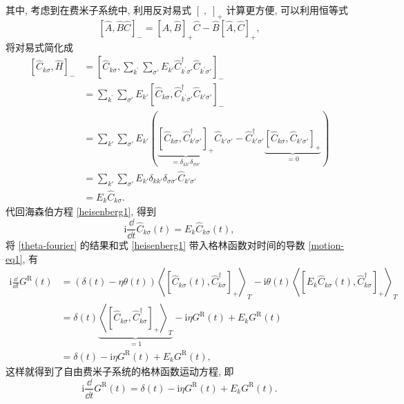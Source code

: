 其中, 考虑到在费米子系统中, 利用反对易式 $[\; ,\;]_+$ 计算更方便, 可以利用恒等式
\begin{equation}
    \left[ \hat{A},\hat{B}\hat{C} \right]_-=\left[ \hat{A},\hat{B} \right]_+\hat{C}-\hat{B}\left[ \hat{A},\hat{C} \right]_+,
\end{equation}
将对易式简化成
   \begin{align}
        \left[ \hat{C}_{k\sigma}^{ },\hat{H} \right]_- &=\left[ \hat{C}_{k\sigma},\sum_{k^\prime}\sum_{\sigma'}E_{k'}\hat{C}_{k^\prime\sigma'}^{\dagger} \hat{C}_{k^\prime\sigma'}^{ } \right]_-\nonumber\\
        &=\sum_{k^\prime}\sum_{\sigma'}E_{k'}\left[ \hat{C}_{k\sigma}^{ },\hat{C}_{k^\prime\sigma'}^{\dagger}\hat{C}_{k'\sigma'}^{ } \right]_-\nonumber\\
        &=\sum_{k'}\sum_{\sigma'}E_{k'}\left( \underbrace{\left[ \hat{C}_{k\sigma}^{ },\hat{C}_{k'\sigma'}^{\dagger} \right]_+}_{=\delta_{kk'}\delta_{\sigma\sigma'}} \hat{C}_{k'\sigma'}^{ }-\hat{C}_{k'\sigma'}^{\dagger}\underbrace{\left[ \hat{C}_{k\sigma}^{ },\hat{C}_{k'\sigma'}^{ } \right]_+}_{=0} \right)\nonumber\\
        &=\sum_{k'}\sum_{\sigma'}E_{k'}\delta_{kk'}\delta_{\sigma\sigma'}\hat{C}_{k'\sigma'}^{ }\nonumber\\
        &=E^{}_{k}\hat{C}_{k\sigma}^{ }.
    \end{align}
代回海森伯方程 \eqref{heisenberg1}, 得到
\begin{equation}
    \mathrm{i}\frac{\dd}{\dd t}\hat{C}_{k\sigma}(t)=E_k\hat{C}_{k\sigma}(t),\label{heisenberg2}
\end{equation}
将 \eqref{theta-fourier} 的结果和式 \eqref{heisenberg1} 带入格林函数对时间的导数 \eqref{motion-eq1}, 有
  \begin{align}
        \mathrm{i}\frac{\dd}{\dd t}G^{\mathrm{R}}(t)&=\left( \delta(t)-\eta\theta(t) \right)\left\langle \left[ \hat{C}_{k\sigma}^{ }(t),\hat{C}_{k\sigma}^{\dagger} \right]_+ \right\rangle_T-\mathrm{i}\theta(t)\left\langle \left[ E_k\hat{C}_{k\sigma}^{ }(t),\hat{C}_{k\sigma}^{\dagger} \right]_+ \right\rangle_T\nonumber\\
        &=\delta(t)\underbrace{\left\langle \left[ \hat{C}_{k\sigma}^{ },\hat{C}_{k\sigma}^{\dagger} \right]_+ \right\rangle_T}_{=1}-\mathrm{i}\eta G^{\mathrm{R}}(t)+E_kG^{\mathrm{R}}(t)\nonumber\\
        &=\delta(t)-\mathrm{i}\eta G^{\mathrm{R}}(t)+E_kG^{\mathrm{R}}(t),
    \end{align}
这样就得到了自由费米子系统的格林函数运动方程, 即
\begin{equation}
    \mathrm{i}\frac{\dd}{\dd t}G^{\mathrm{R}}(t)=\delta(t)-\mathrm{i}\eta G^{\mathrm{R}}(t)+E_kG^{\mathrm{R}}(t).\label{motion-eq2}
\end{equation}

